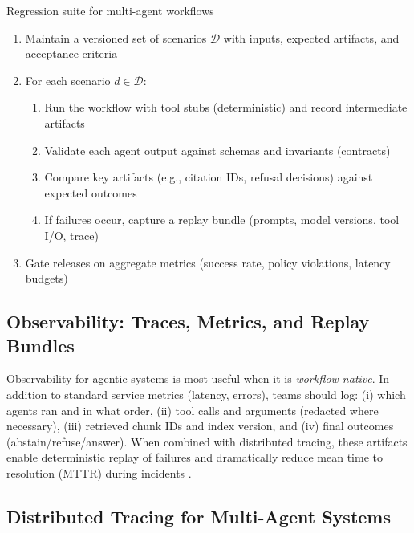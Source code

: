 \begin{llmalgobox}{Regression suite for multi-agent workflows}
\label{alg:ch09_agent_regression_suite}
\small
\begin{enumerate}[leftmargin=1.4em, itemsep=2pt]
  \item Maintain a versioned set of scenarios $\mathcal{D}$ with inputs, expected artifacts, and acceptance criteria
  \item For each scenario $d \in \mathcal{D}$:
    \begin{enumerate}[leftmargin=1.2em, itemsep=1pt]
      \item Run the workflow with tool stubs (deterministic) and record intermediate artifacts
      \item Validate each agent output against schemas and invariants (contracts)
      \item Compare key artifacts (e.g., citation IDs, refusal decisions) against expected outcomes
      \item If failures occur, capture a replay bundle (prompts, model versions, tool I/O, trace)
    \end{enumerate}
  \item Gate releases on aggregate metrics (success rate, policy violations, latency budgets)
\end{enumerate}
\end{llmalgobox}

\subsection{Observability: Traces, Metrics, and Replay Bundles}
Observability for agentic systems is most useful when it is \emph{workflow-native}.
In addition to standard service metrics (latency, errors), teams should log:
(i) which agents ran and in what order,
(ii) tool calls and arguments (redacted where necessary),
(iii) retrieved chunk IDs and index version,
and (iv) final outcomes (abstain/refuse/answer).
When combined with distributed tracing, these artifacts enable deterministic replay of failures and dramatically reduce mean time to resolution (MTTR) during incidents \cite{OpenTelemetryTraces}.

\subsection{Distributed Tracing for Multi-Agent Systems}
\label{sec:ch09-distributed-tracing}

